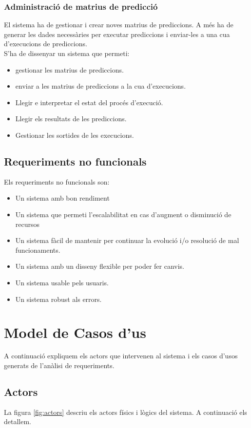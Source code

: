 \subsubsection{Administraci\'{o} de matrius de predicci\'{o}}
El sistema ha de gestionar i crear noves matrius de prediccions. A m\'{e}s ha de generar les dades necessàries per executar prediccions i enviar-les a una cua d'execucions de prediccions.\\

S'ha de dissenyar un sistema que permeti:
\begin{itemize}
	\item gestionar les matrius de prediccions.
	\item enviar a les matrius de prediccions a la cua d'execucions.
	\item Llegir e interpretar el estat del proc\'{e}s d'execució.
	\item Llegir els resultats de les prediccions.
	\item Gestionar les sortides de les execucions.
\end{itemize}

\subsection{Requeriments no funcionals}
Els requeriments no funcionals son:
\begin{itemize}
\item Un sistema amb bon rendiment 
\item Un sistema que permeti l'escalabilitat en cas d'augment o disminució de recursos
\item Un sistema fàcil de mantenir per continuar la evolució i/o resolució de mal funcionaments.
\item Un sistema amb un disseny flexible per poder fer canvis.
\item Un sistema usable pels usuaris.
\item Un sistema robust als errors.
\end{itemize}

\section{Model de Casos d'us}
A continuació expliquem els actors que intervenen al sistema i els casos d'usos generats de l'anàlisi de requeriments.

\subsection{Actors}
La figura \ref{fig:actors} descriu els actors físics i lògics del sistema. A continuació els detallem.

